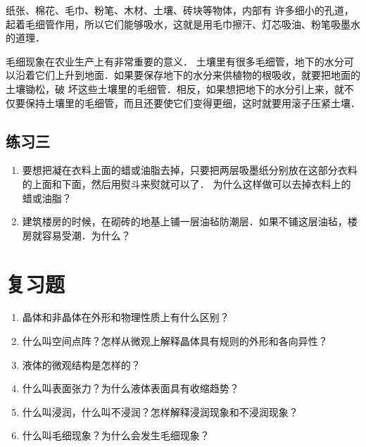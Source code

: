 纸张、棉花、毛巾、粉笔、木材、土壤、砖块等物体，内部有
许多细小的孔道，起着毛细管作用，所以它们能够吸水，这就是用毛巾擦汗、灯芯吸油、粉笔吸墨水的道理．

毛细现象在农业生产上有非常重要的意义．
土壤里有很多毛细管，地下的水分可以沿着它们上升到地面．如果要保存地下的水分来供植物的根吸收，就要把地面的土壤锄松，破
坏这些土壤里的毛细管．相反，如果想把地下的水分引上来，就不仅要保持土壤里的毛细管，而且还要使它们变得更细，这时就要用滚子压紧土壤．

\subsection*{练习三}
\begin{enumerate}
\item 要想把凝在衣料上面的蜡或油脂去掉，只要把两层吸墨纸分别放在这部分衣料的上面和下面，然后用熨斗来熨就可以了．
为什么这样做可以去掉衣料上的蜡或油脂？
\item 建筑楼房的时候，在砌砖的地基上铺一层油毡防潮层．如果不铺这层油毡，楼房就容易受潮．为什么？
\end{enumerate}

\section*{复习题}

\begin{enumerate}
\item 晶体和非晶体在外形和物理性质上有什么区别？
\item 什么叫空间点阵？怎样从微观上解释晶体具有规则的外形和各向异性？
\item 液体的微观结构是怎样的？
\item 什么叫表面张力？为什么液体表面具有收缩趋势？
\item 什么叫浸润，什么叫不浸润？怎样解释浸润现象和不浸润现象？
\item 什么叫毛细现象？为什么会发生毛细现象？
\end{enumerate}



